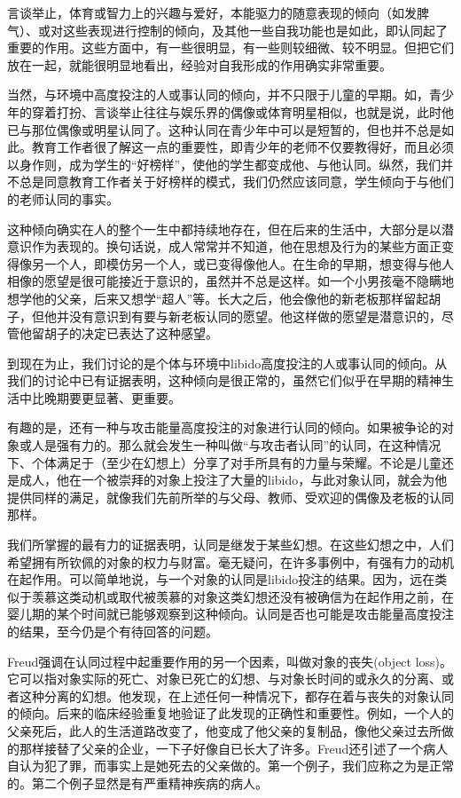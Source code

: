 \documentclass[UTF8,10pt,a4paper,openany]{book}
\begin{document}
言谈举止，体育或智力上的兴趣与爱好，本能驱力的随意表现的倾向（如发脾气）、或对这些表现进行控制的倾向，及其他一些自我功能也是如此，即认同起了重要的作用。这些方面中，有一些很明显，有一些则较细微、较不明显。但把它们放在一起，就能很明显地看出，经验对自我形成的作用确实非常重要。

当然，与环境中高度投注的人或事认同的倾向，并不只限于儿童的早期。如，青少年的穿着打扮、言谈举止往往与娱乐界的偶像或体育明星相似，也就是说，此时他已与那位偶像或明星认同了。这种认同在青少年中可以是短暂的，但也并不总是如此。教育工作者很了解这一点的重要性，即青少年的老师不仅要教得好，而且必须以身作则，成为学生的“好榜样”，使他的学生都变成他、与他认同。纵然，我们并不总是同意教育工作者关于好榜样的模式，我们仍然应该同意，学生倾向于与他们的老师认同的事实。

这种倾向确实在人的整个一生中都持续地存在，但在后来的生活中，大部分是以潜意识作为表现的。换句话说，成人常常并不知道，他在思想及行为的某些方面正变得像另一个人，即模仿另一个人，或已变得像他人。在生命的早期，想变得与他人相像的愿望是很可能接近于意识的，虽然并不总是这样。如一个小男孩毫不隐瞒地想学他的父亲，后来又想学“超人”等。长大之后，他会像他的新老板那样留起胡子，但他并没有意识到有要与新老板认同的愿望。他这样做的愿望是潜意识的，尽管他留胡子的决定已表达了这种感望。

到现在为止，我们讨论的是个体与环境中libido高度投注的人或事认同的倾向。从我们的讨论中已有证据表明，这种倾向是很正常的，虽然它们似乎在早期的精神生活中比晚期要更显著、更重要。

有趣的是，还有一种与攻击能量高度投注的对象进行认同的倾向。如果被争论的对象或人是强有力的。那么就会发生一种叫做“与攻击者认同”的认同，在这种情况下、个体满足于（至少在幻想上）分享了对手所具有的力量与荣耀。不论是儿童还是成人，他在一个被崇拜的对象上投注了大量的libido，与此对象认同，就会为他提供同样的满足，就像我们先前所举的与父母、教师、受欢迎的偶像及老板的认同那样。

我们所掌握的最有力的证据表明，认同是继发于某些幻想。在这些幻想之中，人们希望拥有所钦佩的对象的权力与财富。毫无疑问，在许多事例中，有强有力的动机在起作用。可以简单地说，与一个对象的认同是libido投注的结果。因为，远在类似于羡慕这类动机或取代被羡慕的对象这类幻想还没有被确信为在起作用之前，在婴儿期的某个时间就已能够观察到这种倾向。认同是否也可能是攻击能量高度投注的结果，至今仍是个有待回答的问题。

Freud强调在认同过程中起重要作用的另一个因素，叫做对象的丧失(object loss)。它可以指对象实际的死亡、对象已死亡的幻想、与对象长时间的或永久的分离、或者这种分离的幻想。他发现，在上述任何一种情况下，都存在着与丧失的对象认同的倾向。后来的临床经验重复地验证了此发现的正确性和重要性。例如，一个人的父亲死后，此人的生活道路改变了，他变成了他父亲的复制品，像他父亲过去所做的那样接替了父亲的企业，一下子好像自已长大了许多。Freud还引述了一个病人自认为犯了罪，而事实上是她死去的父亲做的。第一个例子，我们应称之为是正常的。第二个例子显然是有严重精神疾病的病人。
\end{document}
